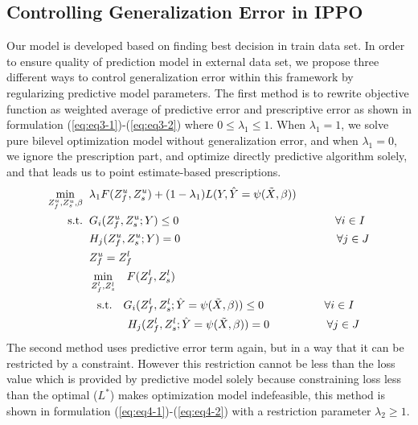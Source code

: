 \documentclass[12pt]{article}
\begin{document}
\subsection{Controlling Generalization Error in IPPO}
\label{sec:ControllingGeneralizationErrorinIPPO}
Our model is developed based on finding best decision in train data set. In order to ensure quality of prediction model in external data set, we propose three different ways to control generalization error within this framework by regularizing predictive model parameters. The first method is to rewrite objective function as weighted average of predictive error and prescriptive error as shown in formulation (\ref{eq:eq3-1})-(\ref{eq:eq3-2}) where $0 \leq \lambda_1 \leq 1$. When $\lambda_1=1$, we solve pure bilevel optimization model without generalization error, and when $\lambda_1=0$, we ignore the prescription part, and optimize directly predictive algorithm solely, and that leads us to point estimate-based prescriptions.
\begin{subequations}
\begin{flalign}
\min\limits_{{Z_f^u,Z_s^u,\beta}} \hspace{2 mm} & \lambda_1F(Z_f^u,Z_s^u)+(1-\lambda_1) L(Y,\hat{Y}=\psi(\Tilde{X},\beta)) \label{eq:eq3-1}\\
\textrm{s.t.} \hspace{2 mm} & G_i(Z_f^u,Z_s^u;Y)\leq 0 \hspace{49 mm} \forall i \in I\\
& H_j(Z_f^u,Z_s^u;Y)=0 \hspace{49 mm} \forall j \in J\\
& Z_f^u=Z_f^l\\
&\min\limits_{Z_f^l,Z_s^l}  \hspace{3 mm} F(Z_f^l,Z_s^l)\\
&\hspace{2.5 mm} \textrm{s.t.} \hspace{3.5 mm} G_i(Z_f^l,Z_s^l;\hat{Y}=\psi(\Tilde{X},\beta))\leq 0 \hspace{19 mm} \forall i \in I\\
&\hspace{12 mm} H_j(Z_f^l,Z_s^l;\hat{Y}=\psi(\Tilde{X},\beta))= 0 \hspace{18 mm} \forall j \in J \label{eq:eq3-2}
\end{flalign}
\end{subequations}
The second method uses predictive error term again, but in a way that it can be restricted by a constraint. However this restriction cannot be less than the loss value which is provided by predictive model solely because constraining loss less than the optimal ($L^*$) makes optimization model indefeasible, this method is shown in formulation (\ref{eq:eq4-1})-(\ref{eq:eq4-2}) with a restriction parameter $\lambda_2 \geq 1$.\\
\end{document}
